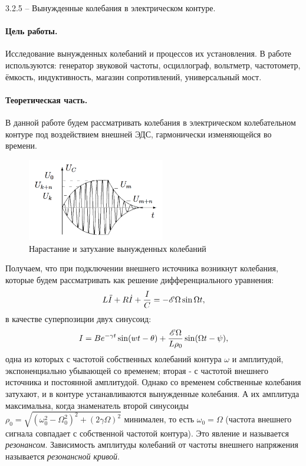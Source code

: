 \documentclass{lab_class}
\begin{document}
{\Large 3.2.5 --  Вынужденные колебания в электрическом контуре.}

\paragraph{Цель работы.}
Исследование вынужденных колебаний и процессов их установления.
В работе используются: генератор звуковой частоты, осциллограф, вольтметр, частотометр, ёмкость, индуктивность, магазин сопротивлений, универсальный мост.

\paragraph{Теоретическая часть.}
В данной работе будем рассматривать колебания в электрическом колебательном контуре под воздействием внешней ЭДС, гармонически изменяющейся во времени.
 
\begin{figure}
\centering
\includegraphics[width=6cm]{Fig3.png}
\caption{Нарастание и затухание вынужденных колебаний}
\end{figure}

Получаем, что при подключении внешнего источника возникнут колебания, которые будем рассматривать как решение дифференциального уравнения:
\begin{equation}
L\ddot{I} + R \dot{I} + \dfrac{I}{C} = - \mathscr{E} \Omega \sin \Omega t,
\end{equation}
в качестве суперпозиции двух синусоид: 
\begin{equation}
I = Be^{-\gamma t} \sin (wt-\theta) + \dfrac{\mathscr{E} \Omega}{L \rho_0} \sin (\Omega t - \psi),
\end{equation}
одна из которых с частотой собственных колебаний контура $\omega$ и амплитудой, экспоненциально убывающей со временем; вторая - с частотой внешнего источника и постоянной амплитудой. Однако со временем собственные колебания затухают, и в контуре устанавливаются вынужденные колебания. А их амплитуда максимальна, когда знаменатель второй синусоиды $\rho_0 = \sqrt{(\omega_0^2 - \Omega^2_0)^2 + (2\gamma \Omega)^2}$ минимален, то есть $\omega_0 = \Omega$ (частота внешнего сигнала совпадает с собственной частотой контура). Это явление и называется \textit{резонансом}. Зависимость амплитуды колебаний от частоты внешнего напряжения называется \textit{резонансной кривой}.
\end{document}
